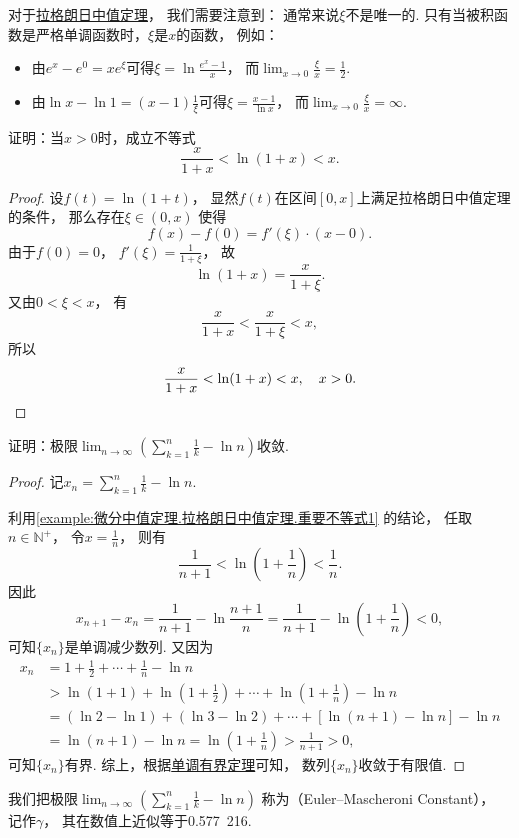 \begin{remark}
对于\hyperref[theorem:微分中值定理.拉格朗日中值定理]{拉格朗日中值定理}，
我们需要注意到：
通常来说\(\xi\)不是唯一的.
只有当被积函数是严格单调函数时，\(\xi\)是\(x\)的函数，
例如：\begin{itemize}
	\item 由\(e^x - e^0 = x e^\xi\)可得\(\xi = \ln\frac{e^x-1}{x}\)，
	而\(\lim_{x\to0} \frac{\xi}{x} = \frac12\).
	\item 由\(\ln x - \ln1 = (x-1) \frac1\xi\)可得\(\xi = \frac{x-1}{\ln x}\)，
	而\(\lim_{x\to0} \frac{\xi}{x} = \infty\).
\end{itemize}
\end{remark}

\begin{example}\label{example:微分中值定理.拉格朗日中值定理.重要不等式1}
证明：当\(x>0\)时，成立不等式\[
	\frac{x}{1+x} < \ln(1+x) < x.
\]
\begin{proof}
设\(f(t) = \ln(1+t)\)，
显然\(f(t)\)在区间\([0,x]\)上满足拉格朗日中值定理的条件，
那么存在\(\xi\in(0,x)\)
使得\[
	f(x)-f(0)=f'(\xi)\cdot(x-0).
\]
由于\(f(0)=0\)，
\(f'(\xi)=\frac{1}{1+\xi}\)，
故\[
	\ln(1+x) = \frac{x}{1+\xi}.
\]
又由\(0<\xi<x\)，
有\[
	\frac{x}{1+x}<\frac{x}{1+\xi}<x,
\]
所以\[
	\frac{x}{1+x}<\ln(1+x)<x, \quad x > 0.
	\qedhere
\]
\end{proof}
\end{example}

\begin{example}\label{example:微分中值定理.拉格朗日中值定理.欧拉--马歇罗尼常数}
证明：极限\(\lim_{n\to\infty} \left(\sum_{k=1}^n \frac{1}{k} - \ln n\right)\)收敛.
\begin{proof}
记\(x_n = \sum_{k=1}^n \frac{1}{k} - \ln n\).

利用\cref{example:微分中值定理.拉格朗日中值定理.重要不等式1} 的结论，
任取\(n\in\mathbb{N}^+\)，
令\(x=\frac{1}{n}\)，
则有\[
	\frac{1}{n+1} < \ln(1+\frac{1}{n}) < \frac{1}{n}.
\]
因此\[
	x_{n+1} - x_n = \frac{1}{n+1} - \ln\frac{n+1}{n}
	= \frac{1}{n+1} - \ln(1+\frac{1}{n}) < 0,
\]
可知\(\{x_n\}\)是单调减少数列.
又因为\begin{align*}
	x_n &= 1 + \frac{1}{2} + \dotsb + \frac{1}{n} - \ln n \\
	&> \ln(1+1) + \ln(1+\frac{1}{2}) + \dotsb + \ln(1+\frac{1}{n}) - \ln n \\
	&= (\ln2-\ln1)+(\ln3-\ln2)+\dotsb+[\ln(n+1)-\ln n] - \ln n \\
	&= \ln(n+1) - \ln n
	= \ln(1+\frac{1}{n})
	> \frac{1}{n+1} > 0,
\end{align*}
可知\(\{x_n\}\)有界.
综上，根据\hyperref[theorem:极限.函数的单调有界定理]{单调有界定理}可知，
数列\(\{x_n\}\)收敛于有限值.
\end{proof}
\end{example}
\begin{remark}
我们把极限\(\lim_{n\to\infty} \left(\sum_{k=1}^n \frac{1}{k} - \ln n\right)\)
称为（Euler--Mascheroni Constant），
记作\(\gamma\)，
其在数值上近似等于{0.577~216}.
\end{remark}

